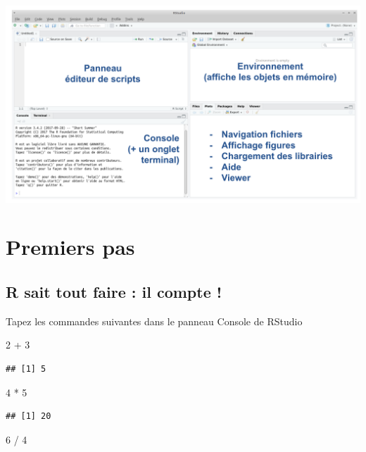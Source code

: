 \documentclass[
]{book}
\newenvironment{Shaded}{\begin{snugshade}}{\end{snugshade}}
\newcommand{\DecValTok}[1]{\textcolor[rgb]{0.00,0.00,0.81}{#1}}
\newcommand{\SpecialCharTok}[1]{\textcolor[rgb]{0.00,0.00,0.00}{#1}}
\begin{document}
\includegraphics{images/rstudio.png}

\hypertarget{premiers-pas}{%
\chapter{Premiers pas}\label{premiers-pas}}

\hypertarget{r-sait-tout-faire-il-compte}{%
\section{R sait tout faire : il compte !}\label{r-sait-tout-faire-il-compte}}

Tapez les commandes suivantes dans le panneau Console de RStudio

\begin{Shaded}
\begin{Highlighting}[]
\DecValTok{2} \SpecialCharTok{+} \DecValTok{3}
\end{Highlighting}
\end{Shaded}

\begin{verbatim}
## [1] 5
\end{verbatim}

\begin{Shaded}
\begin{Highlighting}[]
\DecValTok{4} \SpecialCharTok{*} \DecValTok{5}
\end{Highlighting}
\end{Shaded}

\begin{verbatim}
## [1] 20
\end{verbatim}

\begin{Shaded}
\begin{Highlighting}[]
\DecValTok{6} \SpecialCharTok{/} \DecValTok{4}
\end{Highlighting}
\end{Shaded}
\end{document}
